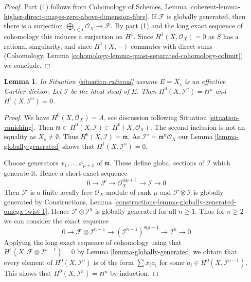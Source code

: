 \documentclass{stacks-project}
\theoremstyle{plain}
\newtheorem{lemma}[subsection]{Lemma}
\theoremstyle{definition}
\theoremstyle{remark}
\numberwithin{equation}{subsection}
\begin{document}
\begin{proof}
Part (1) follows from  Cohomology of Schemes, Lemma
\ref{coherent-lemma-higher-direct-images-zero-above-dimension-fibre}.
If $\mathcal{F}$ is globally generated, then there is a surjection
$\bigoplus_{i \in I} \mathcal{O}_X \to \mathcal{F}$. By part (1)
and the long exact sequence of cohomology this
induces a surjection on $H^1$. Since $H^1(X, \mathcal{O}_X) = 0$
as $S$ has a rational singularity, and since $H^1(X, -)$ commutes
with direct sums
(Cohomology, Lemma \ref{cohomology-lemma-quasi-separated-cohomology-colimit})
we conclude.
\end{proof}

\begin{lemma}
\label{lemma-sections-powers-I-rational}
In Situation \ref{situation-rational} assume
$E = X_s$ is an effective Cartier divisor.
Let $\mathcal{I}$ be the ideal sheaf of $E$. Then
$H^0(X, \mathcal{I}^n) = \mathfrak m^n$ and
$H^1(X, \mathcal{I}^n) = 0$.
\end{lemma}

\begin{proof}
We have $H^0(X, \mathcal{O}_X) = A$, see discussion following
Situation \ref{situation-vanishing}. Then
$\mathfrak m \subset H^0(X, \mathcal{I}) \subset H^0(X, \mathcal{O}_X)$.
The second inclusion is not an equality as $X_s \not = \emptyset$.
Thus $H^0(X, \mathcal{I}) = \mathfrak m$.
As $\mathcal{I}^n = \mathfrak m^n\mathcal{O}_X$ our
Lemma \ref{lemma-globally-generated} shows that $H^1(X, \mathcal{I}^n) = 0$.

\medskip\noindent
Choose generators $x_1, \ldots, x_{\mu + 1}$ of $\mathfrak m$. These define
global sections of $\mathcal{I}$ which generate it. Hence
a short exact sequence
$$
0 \to \mathcal{F} \to \mathcal{O}_X^{\oplus \mu + 1} \to \mathcal{I} \to 0
$$
Then $\mathcal{F}$ is a finite locally free $\mathcal{O}_X$-module
of rank $\mu$ and $\mathcal{F} \otimes \mathcal{I}$ is globally
generated by Constructions, Lemma
\ref{constructions-lemma-globally-generated-omega-twist-1}.
Hence $\mathcal{F} \otimes \mathcal{I}^n$
is globally generated for all $n \geq 1$. Thus for $n \geq 2$ we can
consider the exact sequence
$$
0 \to \mathcal{F} \otimes \mathcal{I}^{n - 1} \to
(\mathcal{I}^{n - 1})^{\oplus \mu + 1} \to
\mathcal{I}^n \to 0
$$
Applying the long exact sequence of cohomology using that
$H^1(X, \mathcal{F} \otimes \mathcal{I}^{n - 1}) = 0$ by
Lemma \ref{lemma-globally-generated}
we obtain that every
element of $H^0(X, \mathcal{I}^n)$ is of the form $\sum x_i a_i$
for some $a_i \in H^0(X, \mathcal{I}^{n - 1})$. This shows that
$H^0(X, \mathcal{I}^n) = \mathfrak m^n$ by induction.
\end{proof}
\end{document}
